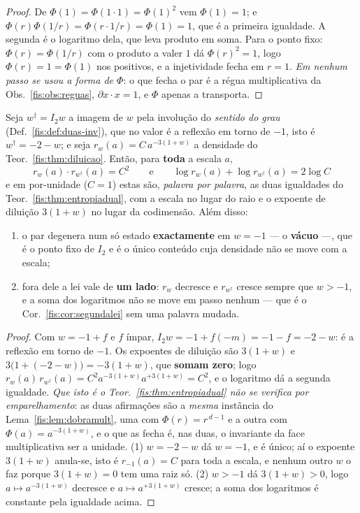 \documentclass[livro.tex]{subfiles}
\begin{document}
\begin{proof}
De $\Phi(1)=\Phi(1\cdot1)=\Phi(1)^{2}$ vem $\Phi(1)=1$; e
$\Phi(r)\Phi(1/r)=\Phi(r\cdot 1/r)=\Phi(1)=1$, que é a primeira igualdade. A
segunda é o logaritmo dela, que leva produto em soma. Para o ponto fixo:
$\Phi(r)=\Phi(1/r)$ com o produto a valer $1$ dá $\Phi(r)^{2}=1$, logo
$\Phi(r)=1=\Phi(1)$ nos positivos, e a injetividade fecha em $r=1$. \emph{Em
nenhum passo se usou a forma de $\Phi$}: o que fecha o par é a régua multiplicativa da
Obs.~\ref{fis:obs:reguas}, $\partial x\cdot x=1$, e $\Phi$ apenas a transporta.
\end{proof}

\begin{corolario}\label{fis:cor:ponte}
Seja $w^{\dagger}=I_2w$ a imagem de $w$ pela involução do \emph{sentido do grau}
(Def.~\ref{fis:def:duas-inv}), que no valor é a reflexão em torno de $-1$, isto é
$w^{\dagger}=-2-w$; e seja $r_w(a)=C\,a^{-3(1+w)}$ a densidade do
Teor.~\ref{fis:thm:diluicao}. Então, para \textbf{toda} a escala $a$,
\[
\boxed{\;r_w(a)\cdot r_{w^{\dagger}}(a)=C^{2}
\qquad\text{e}\qquad
\log r_w(a)+\log r_{w^{\dagger}}(a)=2\log C\;}
\]
e em por-unidade ($C=1$) estas são, \emph{palavra por palavra}, as duas
igualdades do Teor.~\ref{fis:thm:entropiadual}, com a escala no lugar do raio e o
expoente de diluição $3(1+w)$ no lugar da codimensão. Além disso:
\begin{enumerate}\itemsep3pt
\item[(1)] o par degenera num só estado \textbf{exactamente} em $w=-1$ --- o
\textbf{vácuo} ---, que é o ponto fixo de $I_2$ e é o único conteúdo cuja
densidade não se move com a escala;
\item[(2)] fora dele a lei vale de \textbf{um lado}: $r_w$ decresce e
$r_{w^{\dagger}}$ cresce sempre que $w>-1$, e a soma dos logaritmos não se move em
passo nenhum --- que é o Cor.~\ref{fis:cor:segundalei} sem uma palavra mudada.
\end{enumerate}
\end{corolario}

\begin{proof}
Com $w=-1+f$ e $f$ ímpar, $I_2w=-1+f(-m)=-1-f=-2-w$: é a reflexão em torno de
$-1$. Os expoentes de diluição são $3(1+w)$ e $3\bigl(1+(-2-w)\bigr)=-3(1+w)$,
que \textbf{somam zero}; logo
$r_w(a)\,r_{w^{\dagger}}(a)=C^{2}a^{-3(1+w)}a^{+3(1+w)}=C^{2}$, e o logaritmo dá
a segunda igualdade. \emph{Que isto é o Teor.~\ref{fis:thm:entropiadual} não se
verifica por emparelhamento}: as duas afirmações são a \emph{mesma} instância do
Lema~\ref{fis:lem:dobramult}, uma com $\Phi(r)=r^{\,d-1}$ e a outra com
$\Phi(a)=a^{-3(1+w)}$, e o que as fecha é, nas duas, o invariante da face
multiplicativa ser a unidade. (1) $w=-2-w$ dá $w=-1$, e é único; aí o expoente
$3(1+w)$ anula-se, isto é $r_{-1}(a)=C$ para toda a escala, e nenhum outro $w$ o
faz porque $3(1+w)=0$ tem uma raiz só. (2) $w>-1$ dá $3(1+w)>0$, logo
$a\mapsto a^{-3(1+w)}$ decresce e $a\mapsto a^{+3(1+w)}$ cresce; a soma dos
logaritmos é constante pela igualdade acima.
\end{proof}
\end{document}
